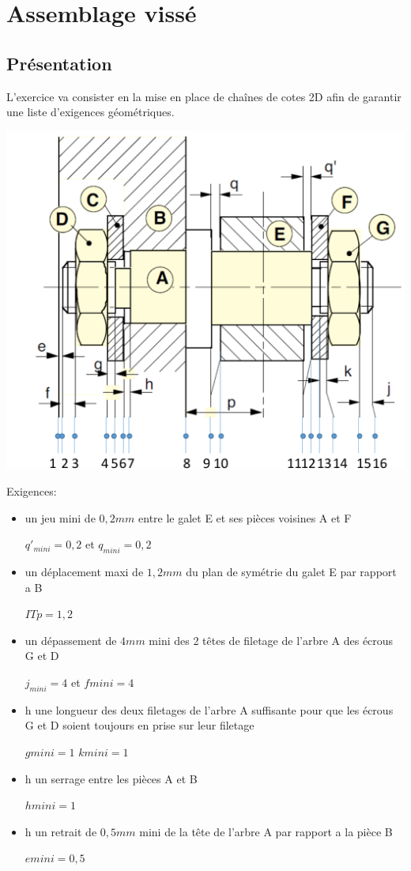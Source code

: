 

\section{Assemblage vissé}

\subsection{Présentation}

L'exercice va consister en la mise en place de chaînes de cotes 2D afin de garantir une liste d'exigences géométriques.

\begin{center}
 \includegraphics[width=0.7\linewidth]{img/Specifs_num}
\end{center}

Exigences:
\begin{itemize}
 \item un jeu mini de $0,2mm$ entre le galet E et ses pièces voisines A et F
 
 $q'_{mini} = 0,2$ et  $q_{mini} = 0,2$
 \item un déplacement maxi de $1,2mm$ du plan de symétrie du galet E par rapport a B

 $IT p = 1,2$ 
 \item un dépassement de $4mm$ mini des 2 têtes de filetage de l'arbre A des écrous G et D

 $j_{mini} = 4$ et $f mini = 4$
 \item h une longueur des deux filetages de l'arbre A suffisante pour que les écrous G et D soient toujours en prise sur leur filetage
 
 $g mini = 1$
 $k mini = 1$
 \item h un serrage entre les pièces A et B

 $h mini = 1$
 \item h un retrait de $0,5mm$ mini de la tête de l'arbre A par rapport a la pièce B

 $e mini = 0,5$
\end{itemize}

